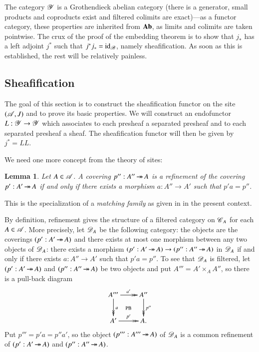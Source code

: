 \documentclass[1p]{elsarticle}
\makeatletter
\renewenvironment{proof}[1][\proofname]{\par
  \pushQED{\qed}%
  \normalfont \topsep6\p@\@plus6\p@\relax
  \trivlist
  \item[\hskip\labelsep
        \scshape
    #1\@addpunct{.}]\ignorespaces
}{%
  \popQED\endtrivlist\@endpefalse
}
\theoremstyle{mythm}
\newtheorem{Lem}[Thm]{Lemma}
\theoremstyle{mydef}
\makeatother
\begin{document}
The category $\operatorname{\mathscr{Y}}$ is a Grothendieck abelian category (there is a
generator, small products and coproducts exist and
filtered colimits are exact)---as a
functor category, these properties are inherited from $\operatorname{\mathbf{Ab}}$, as limits
and colimits are taken pointwise. The crux of the proof of the
embedding theorem is to show
that $j_{\ast}$ has a left adjoint $j^{\ast}$ such that
$j^{\ast}j_{\ast} = \operatorname{id}_{\operatorname{\mathscr{B}}}$, namely sheaf\mbox{}ification. As
soon as this is established, the rest will be relatively painless.

\subsection{Sheaf\mbox{}ification}

The goal of this section is to construct the sheaf\mbox{}ification
functor on the site $(\operatorname{\mathscr{A}},J)$ and to prove its basic properties. We
will construct an endo\-functor $L: \operatorname{\mathscr{Y}} \to \operatorname{\mathscr{Y}}$ which associates to
each presheaf a separated presheaf and to each separated presheaf a
sheaf. The sheaf\mbox{}ification functor will then be given by
$j^{\ast} = LL$.

We need one more concept from the theory of sites:

\begin{Lem}
  Let $A \in \operatorname{\mathscr{A}}$. A covering $p'': A'' \operatorname{\twoheadrightarrow} A$ is a
  \emph{refinement} of the covering $p': A' \operatorname{\twoheadrightarrow} A$ if
  and only if there exists a morphism $a: A'' \to A'$ such that
  $p' a = p''$.
\end{Lem}

\begin{proof}
  This is the specialization of a
  \emph{matching family} as given in \cite[p.~121]{MR1300636} 
  in the present context.
\end{proof}

By definition, refinement gives the structure of a filtered category
on $\operatorname{\mathscr{C}}_{A}$ for each $A \in \operatorname{\mathscr{A}}$. More precisely, let $\operatorname{\mathscr{D}}_{A}$
be the following category: the objects are the coverings $(p': A' \operatorname{\twoheadrightarrow} A)$
and there exists at most one morphism between any two objects of
$\operatorname{\mathscr{D}}_{A}$: there exists a morphism
$(p': A' \operatorname{\twoheadrightarrow} A) \to (p'': A'' \operatorname{\twoheadrightarrow} A)$ in $\operatorname{\mathscr{D}}_{A}$ if and only if
there exists $a: A'' \to A'$ such that $p'a = p''$. To see that
$\operatorname{\mathscr{D}}_{A}$ is filtered, let $(p':A' \operatorname{\twoheadrightarrow} A)$ and $(p'': A'' \operatorname{\twoheadrightarrow} A)$
be two objects and put $A''' = A' \times_{A} A''$, so there
is a pull-back diagram
\[
\xymatrix{
  A''' \ar@{->>}[d]^{a} \ar@{->>}[r]^{a'} \ar@{}[dr]|{\text{PB}} &
  A'' \ar@{->>}[d]^{p''} \\
  A' \ar@{->>}[r]^{p'} & A.
}
\]
Put $p''' = p'a = p''a'$, so the object
$(p''' : A''' \operatorname{\twoheadrightarrow} A)$ of $\operatorname{\mathscr{D}}_{A}$ is
a common refinement of $(p':A' \operatorname{\twoheadrightarrow} A)$ and $(p'':A'' \operatorname{\twoheadrightarrow} A)$.
\end{document}

